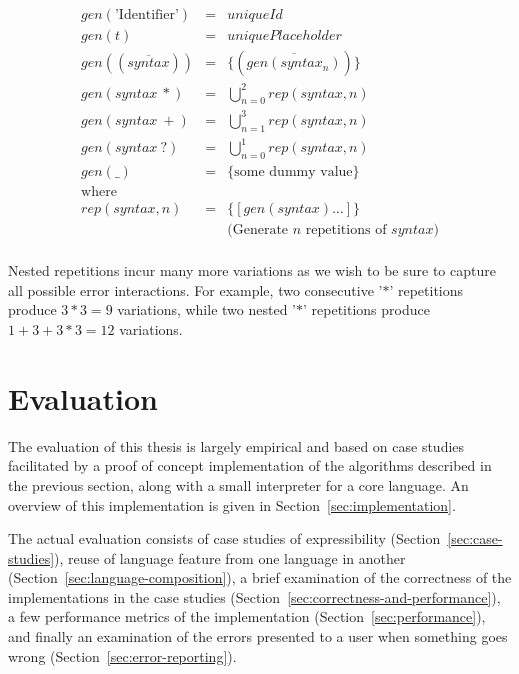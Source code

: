 \documentclass{kththesis}
\begin{document}
$$
\begin{array}{rcl}
gen(\text{'Identifier'}) & = & uniqueId \\
gen(t) & = & uniquePlaceholder \\
gen((\overline{syntax})) & = & \{(\overline{gen(syntax_n)})\} \\
gen(syntax~*) & = & \bigcup_{n=0}^2 rep(syntax, n) \\
gen(syntax~+) & = & \bigcup_{n=1}^3 rep(syntax, n) \\
gen(syntax~?) & = & \bigcup_{n=0}^1 rep(syntax, n) \\
gen(\_) & = & \{\text{some dummy value}\} \\
\text{where} & & \\
rep(syntax, n) & = & \{[gen(syntax)\ldots]\} \\
& & \text{(Generate $n$ repetitions of $syntax$)} \\
\end{array}
$$

Nested repetitions incur many more variations as we wish to be sure to capture all possible error interactions. For example, two consecutive '$*$' repetitions produce $3 * 3 = 9$ variations, while two nested '$*$' repetitions produce $1 + 3 + 3*3 = 12$ variations.

\chapter{Evaluation} \label{sec:evaluation}

The evaluation of this thesis is largely empirical and based on case studies facilitated by a proof of concept implementation of the algorithms described in the previous section, along with a small interpreter for a core language. An overview of this implementation is given in Section~\ref{sec:implementation}.

The actual evaluation consists of case studies of expressibility (Section~\ref{sec:case-studies}), reuse of language feature from one language in another (Section~\ref{sec:language-composition}), a brief examination of the correctness of the implementations in the case studies (Section~\ref{sec:correctness-and-performance}), a few performance metrics of the implementation (Section~\ref{sec:performance}), and finally an examination of the errors presented to a user when something goes wrong (Section~\ref{sec:error-reporting}).

\end{document}

